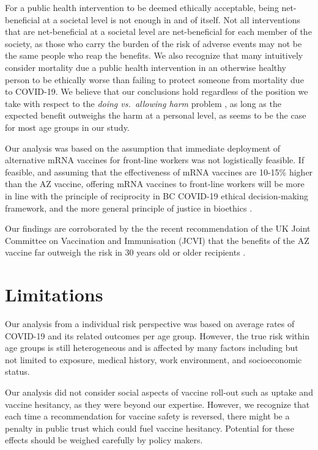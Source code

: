 \documentclass[]{interact}
\theoremstyle{plain}%
\theoremstyle{definition}
\theoremstyle{remark}
\begin{document}
For a public health intervention to be deemed ethically acceptable,
being net-beneficial at a societal level is not enough in and of itself.
Not all interventions that are net-beneficial at a societal level are
net-beneficial for each member of the society, as those who carry the
burden of the risk of adverse events may not be the same people who reap
the benefits. We also recognize that many intuitively consider mortality
due a public health intervention in an otherwise healthy person to be
ethically worse than failing to protect someone from mortality due to
COVID-19. We believe that our conclusions hold regardless of the
position we take with respect to the \emph{doing vs.~allowing harm}
problem \citep{woollard_doing_2016}, as long as the expected benefit
outweighs the harm at a personal level, as seems to be the case for most
age groups in our study.

Our analysis was based on the assumption that immediate deployment of
alternative mRNA vaccines for front-line workers was not logistically
feasible. If feasible, and assuming that the effectiveness of mRNA
vaccines are 10-15\% higher than the AZ vaccine, offering mRNA vaccines
to front-line workers will be more in line with the principle of
reciprocity in BC COVID-19 ethical decision-making
framework\citep{bccdc_covid-19_2020}, and the more general principle of
justice in bioethics \citep{mccormick_principles_2021}.

Our findings are corroborated by the the recent recommendation of the UK
Joint Committee on Vaccination and Immunisation (JCVI) that the benefits
of the AZ vaccine far outweigh the risk in 30 years old or older
recipients \citep{jcvi_jcvi_2021}.

\hypertarget{limitations}{%
\section{Limitations}\label{limitations}}

Our analysis from a individual risk perspective was based on average
rates of COVID-19 and its related outcomes per age group. However, the
true risk within age groups is still heterogeneous and is affected by
many factors including but not limited to exposure, medical history,
work environment, and socioeconomic status.

Our analysis did not consider social aspects of vaccine roll-out such as
uptake and vaccine hesitancy, as they were beyond our expertise.
However, we recognize that each time a recommendation for vaccine safety
is reversed, there might be a penalty in public trust which could fuel
vaccine hesitancy. Potential for these effects should be weighed
carefully by policy makers.
\end{document}
